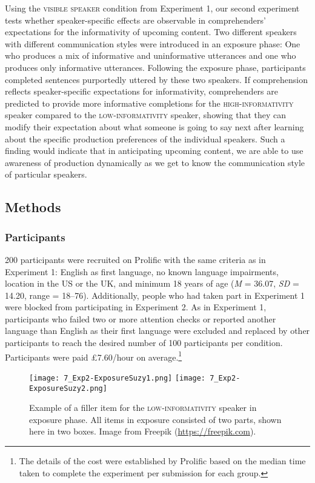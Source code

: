 \documentclass[output=paper,colorlinks,citecolor=brown]{langscibook}
\begin{document}
Using the \textsc{visible speaker} condition from Experiment 1, our second experiment tests whether speaker-specific effects are observable in comprehenders’ expectations for the informativity of upcoming content. Two different speakers with different communication styles were introduced in an exposure phase: One who produces a mix of informative and uninformative utterances and one who produces only informative utterances. Following the exposure phase, participants completed sentences purportedly uttered by these two speakers. If comprehension reflects speaker-specific expectations for informativity, comprehenders are predicted to provide more informative completions for the \textsc{high-informativ\-ity} speaker compared to the \textsc{low-informativity} speaker, showing that they can modify their expectation about what someone is going to say next after learning about the specific production preferences of the individual speakers. Such a finding would indicate that in anticipating upcoming content, we are able to use awareness of production dynamically as we get to know the communication style of particular speakers.

\subsection{Methods}
\subsubsection{Participants}

200 participants were recruited on Prolific with the same criteria as in Experiment 1: English as first language, no known language impairments, location in the US or the UK, and minimum 18 years of age (\textit{M} = 36.07, \textit{SD} = 14.20, range = 18–76). Additionally, people who had taken part in Experiment 1 were blocked from participating in Experiment 2. As in Experiment 1, participants who failed two or more attention checks or reported another language than English as their first language were excluded and replaced by other participants to reach the desired number of 100 participants per condition. Participants were paid £7.60/hour on average.\footnote{The details of the cost were established by Prolific based on the median time taken to complete the experiment per submission for each group.}

\begin{figure}%
\texttt{[image: 7\_Exp2-ExposureSuzy1.png]}
\hfill
\texttt{[image: 7\_Exp2-ExposureSuzy2.png]}
\caption{Example of a filler item for the \textsc{low-informativity} speaker in exposure phase. All items in exposure consisted of two parts, shown here in two boxes. Image from Freepik (\url{https://freepik.com}).}\label{ExposureSuzy}
\end{figure}
\end{document}
